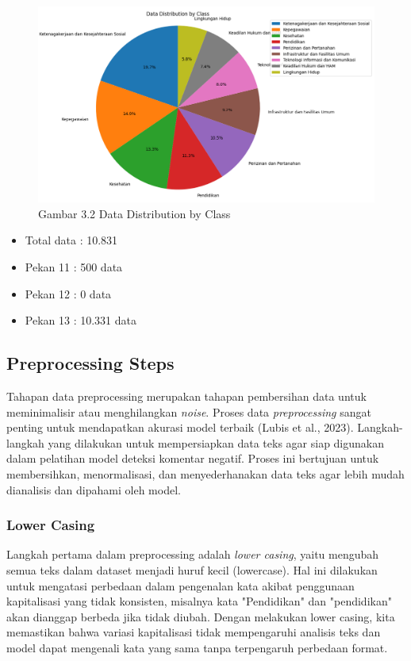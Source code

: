 \documentclass[12pt,a4paper]{article}
\begin{document}
\begin{figure} %
    \centering
    \includegraphics[width=0.5\linewidth]{Image/data distribution by class.png}
    \caption{Gambar 3.2 Data Distribution by Class}
    \label{fig:roc_auc}
\end{figure} 

\begin{itemize}
    \begin{itemize}
        \item Total data : 10.831
        \item Pekan 11 : 500 data
        \item Pekan 12 : 0 data
        \item Pekan 13 : 10.331 data
    \end{itemize}
\end{itemize}

\newpage
\subsection{Preprocessing Steps}
\begin{adjustwidth}{3em}{0pt} \hspace{0.5cm} Tahapan data preprocessing merupakan tahapan pembersihan data untuk meminimalisir atau menghilangkan \textit{noise}. Proses data \textit{preprocessing} sangat penting untuk mendapatkan akurasi model terbaik (Lubis et al., 2023). Langkah-langkah yang dilakukan untuk mempersiapkan data teks agar siap digunakan dalam pelatihan model deteksi komentar negatif. Proses ini bertujuan untuk membersihkan, menormalisasi, dan menyederhanakan data teks agar lebih mudah dianalisis dan dipahami oleh model. \end{adjustwidth}

\subsubsection{Lower Casing}
\begin{adjustwidth}{3em}{0pt} \hspace{0.5cm} Langkah pertama dalam preprocessing adalah \textit{lower casing}, yaitu mengubah semua teks dalam dataset menjadi huruf kecil (lowercase). Hal ini dilakukan untuk mengatasi perbedaan dalam pengenalan kata akibat penggunaan kapitalisasi yang tidak konsisten, misalnya kata "Pendidikan" dan "pendidikan" akan dianggap berbeda jika tidak diubah. Dengan melakukan lower casing, kita memastikan bahwa variasi kapitalisasi tidak mempengaruhi analisis teks dan model dapat mengenali kata yang sama tanpa terpengaruh perbedaan format. \end{adjustwidth}
\end{document}
